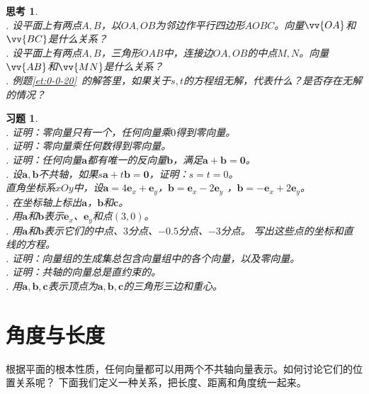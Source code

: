 \documentclass[12pt,UTF8]{ctexbook}
\theoremstyle{definition}
\theoremstyle{plain}
\newtheorem{sk}{思考}[section]
\newtheorem{xt}{习题}[section]
\begin{document}
\begin{sk}\label{sk:0-0-10}
    \mbox{}\\
    . 设平面上有两点$A,B$，以$OA, OB$为邻边作平行四边形$AOBC$。向量$\vv{OA}$和$\vv{BC}$是什么关系？\\
    . 设平面上有两点$A,B$，三角形$OAB$中，连接边$OA, OB$的中点$M,N$。向量$\vv{AB}$和$\vv{MN}$是什么关系？\\
    . 例题\ref{et:0-0-20}\ 的解答里，如果关于$s,t$的方程组无解，代表什么？是否存在无解的情况？
\end{sk}
\begin{xt}\label{xt:0-0-10}
    \mbox{} \\
    . 证明：零向量只有一个，任何向量乘$0$得到零向量。\\
    . 证明：零向量乘任何数得到零向量。\\
    . 证明：任何向量$\mathbf{a}$都有唯一的反向量$\mathbf{b}$，满足$\mathbf{a} + \mathbf{b} = \mathbf{0}$。\\
    . 设$\mathbf{a}, \mathbf{b}$不共轴，如果$s\mathbf{a} + t\mathbf{b} = \mathbf{0}$，证明：$s = t = 0$。\\
    直角坐标系$xOy$中，设$\mathbf{a} = 4\mathbf{e}_x + \mathbf{e}_y$，$\mathbf{b} = \mathbf{e}_x - 2\mathbf{e}_y$
    ，$\mathbf{b} = -\mathbf{e}_x + 2\mathbf{e}_y$。\\
    . 在坐标轴上标出$\mathbf{a}$，$\mathbf{b}$和$\mathbf{c}$。\\
    . 用$\mathbf{a}$和$\mathbf{b}$表示$\mathbf{e}_x$、$\mathbf{e}_y$和点$(3,0)$。\\
    . 用$\mathbf{a}$和$\mathbf{b}$表示它们的中点、$3$分点、$-0.5$分点、$-3$分点。
    写出这些点的坐标和直线的方程。\\
    . 证明：向量组的生成集总包含向量组中的各个向量，以及零向量。\\
    . 证明：共轴的向量总是直约束的。\\
    . 用$\mathbf{a}, \mathbf{b}, \mathbf{c}$表示顶点为$\mathbf{a}, \mathbf{b}, \mathbf{c}$的三角形三边和重心。
\end{xt}

\section{角度与长度}
根据平面的根本性质，任何向量都可以用两个不共轴向量表示。如何讨论它们的位置关系呢？
下面我们定义一种关系，把长度、距离和角度统一起来。
\end{document}
